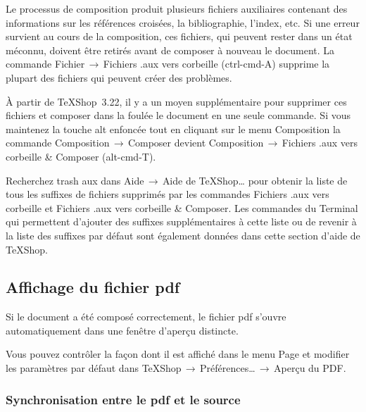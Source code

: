 \documentclass[11pt,french]{article}
\newcommand{\TS}{\textsf{\TeX Shop}}
\newcommand{\acr}[1]{\textsf{#1}}
\newcommand{\cmd}[1]{\textsf{#1}}
\newcommand{\mnu}[1]{\textsf{#1}}
\newcommand{\To}{\,\(\to\)\,}
\begin{document}
Le processus de composition produit plusieurs fichiers auxiliaires contenant des informations sur les références croisées, la bibliographie, l'index, etc. Si une erreur survient au cours de la composition, ces fichiers, qui peuvent rester dans un état méconnu, doivent être retirés avant de composer à nouveau le document. La commande \mnu{Fichier}\To\mnu{Fichiers .aux vers corbeille} (\cmd{ctrl-cmd-A}) supprime la plupart des fichiers qui peuvent créer des problèmes. 

À partir de \TS\ 3.22, il y a un moyen supplémentaire pour supprimer ces fichiers et composer dans la foulée le document en une seule commande. Si vous maintenez la touche \cmd{alt} enfoncée tout en cliquant sur le menu \mnu{Composition} la commande \mnu{Composition}\To\mnu{Composer} devient \mnu{Composition}\To\mnu{Fichiers .aux vers corbeille \& Composer} (\cmd{alt-cmd-T}). 

Recherchez \cmd{trash aux} dans \mnu{Aide}\To\mnu{Aide de TeXShop…} pour obtenir la liste de tous les suffixes de fichiers supprimés par les commandes \mnu{Fichiers .aux vers corbeille} et \mnu{Fichiers .aux vers corbeille \& Composer}. Les commandes du \cmd{Terminal} qui permettent d'ajouter des suffixes supplémentaires à cette liste ou de revenir à la liste des suffixes par défaut sont également données dans cette section d'aide de \TS.

\subsection{Affichage du fichier \acr{pdf}}

Si le document a été composé correctement, le fichier \acr{pdf} s'ouvre automatiquement dans une fenêtre d'aperçu distincte.

Vous pouvez contrôler la façon dont il est affiché dans le menu \mnu{Page} et modifier les paramètres par défaut dans \mnu{TeXShop}\To\mnu{Préférences…}\To\mnu{Aperçu du PDF}.

%

\subsubsection{Synchronisation entre le \acr{pdf} et le source}
\end{document}

